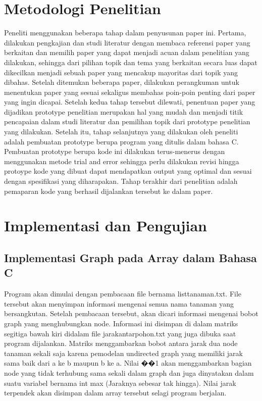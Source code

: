 \documentclass[conference]{IEEEtran}
\begin{document}
\section{Metodologi Penelitian}
Peneliti menggunakan beberapa tahap dalam penyusunan
paper ini. Pertama, dilakukan pengkajian dan studi literatur
dengan membaca referensi paper yang berkaitan dan memilih
paper yang dapat menjadi acuan dalam penelitian yang dilakukan,
sehingga dari pilihan topik dan tema yang berkaitan
secara luas dapat dikecilkan menjadi sebuah paper yang mencakup
mayoritas dari topik yang dibahas. Setelah ditemukan
beberapa paper, dilakukan perangkuman untuk menentukan
paper yang sesuai sekaligus membahas poin-poin penting
dari paper yang ingin dicapai. Setelah kedua tahap tersebut
dilewati, penentuan paper yang dijadikan prototype penelitian
merupakan hal yang mudah dan menjadi titik pencapaian
dalam studi literatur dan pemilihan topik dari prototype penelitian
yang dilakukan.
Setelah itu, tahap selanjutnya yang dilakukan oleh peneliti
adalah pembuatan prototype berupa program yang ditulis
dalam bahasa C. Pembuatan prototype berupa kode ini dilakukan
terus-menerus dengan menggunakan metode trial and
error sehingga perlu dilakukan revisi hingga protoype kode
yang dibuat dapat mendapatkan output yang optimal dan
sesuai dengan spesifikasi yang diharapakan. Tahap terakhir
dari penelitian adalah pemaparan kode yang berhasil dijalankan
tersebut ke dalam paper.


\section{Implementasi dan Pengujian}
\subsection{Implementasi Graph pada Array dalam Bahasa C}
Program akan dimulai dengan pembacaan file bernama
listtanaman.txt. File tersebut akan menyimpan informasi mengenai
semua nama tanaman yang bersangkutan. Setelah pembacaan
tersebut, akan dicari informasi mengenai bobot graph
yang menghubungkan node. Informasi ini disimpan di dalam
matriks segitiga bawah kiri didalam file jarakantarpohon.txt
yang juga dibuka saat program dijalankan. Matriks menggambarkan
bobot antara jarak dua node tanaman sekali saja karena
pemodelan undirected graph yang memiliki jarak sama baik
dari a ke b maupun b ke a. Nilai ��1 akan menggambarkan
bagian node yang tidak terhubung sama sekali dalam graph
dan juga dinyatakan dalam suatu variabel bernama int max
(Jaraknya sebesar tak hingga). Nilai jarak terpendek akan
disimpan dalam array tersebut selagi program berjalan.
\end{document}
